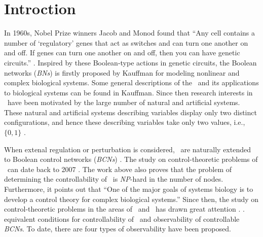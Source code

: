 \section{Introction}
\label{sec:intro}
In 1960s, Nobel Prize winners Jacob and Monod found that  ``Any cell contains a number of `regulatory' genes that act as switches and can turn one another on and off. If genes can turn one another on and off, then you can have genetic circuits.'' \cite{Waldrop1992Complexity,cheng2009controllability}. Inspired by these Boolean-type actions in genetic circuits, the Boolean networks ({\em BNs}) is firstly proposed by Kauffman \cite{Kauffman1968Metabolic} for modeling nonlinear and complex biological systems. Some general descriptions of the \BNs\ and its applications to biological systems can be found in Kauffman. Since then research interests in  \BNs\ have been motivated by the large number of natural and artificial systems. These natural and artificial systems describing variables display only two distinct configurations, and hence these describing variables take only two values, i.e., $\{0,1\}$  \cite{Akutsu2000Inferring, Shmulevich2002From, Faur2006Dynamical,Green2007The,Lou2010Multi,Fornasini2013Observability}.


When extenal regulation or perturbation is considered, \BNs\ are naturally extended to Boolean control networks ({\em BCNs}) \cite{Ideker2001A}. The study on control-theoretic problems of \BCNs\ can date back to 2007 \cite{Akutsu2007Control}. The work above also proves that the problem of determining the controllability of \BCNs\ is {\em NP}-hard in the number of nodes. Furthermore, it points out that ``One of the major goals of systems biology is to develop a control theory for complex biological systems.'' Since then, the study on control-theoretic problems in the areas of \BNs\ and \BCNs\ has drawn great attention \cite{cheng2009controllability, Zhao2010Input, Cheng2011Identification, Cheng2011Analysis,Fornasini2013Observability}. .     equivalent conditions for controllability of \BCNs\ and observability of controllable {\em BCNs}. To date, there are four types of observability have been proposed. 

